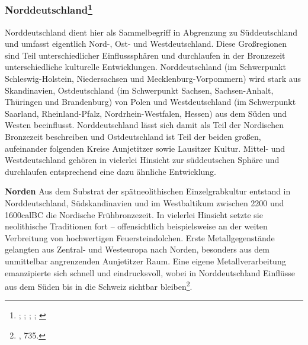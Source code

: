 \documentclass[openany,twoside,twocolumn]{book}
\let\rmarkdownfootnote\footnote%
\def\footnote{\protect\rmarkdownfootnote}
\begin{document}
\hypertarget{norddeutschland}{%
\subsubsection[Norddeutschland]{\texorpdfstring{Norddeutschland\footnote{\textcite{gorner_bestattungssitten_2002}; \textcite{hofmann_rituelle_2008}; \textcite{jockenhovel_germany_2013}; \textcite{jockenhovel_von_2003}; \textcite{schmidt_studien_1993}}}{Norddeutschland}}\label{norddeutschland}}

Norddeutschland dient hier als Sammelbegriff in Abgrenzung zu Süddeutschland und umfasst eigentlich Nord-, Ost- und Westdeutschland. Diese Großregionen sind Teil unterschiedlicher Einflusssphären und durchlaufen in der Bronzezeit unterschiedliche kulturelle Entwicklungen. Norddeutschland (im Schwerpunkt Schleswig-Holstein, Niedersachsen und Mecklenburg-Vorpommern) wird stark aus Skandinavien, Ostdeutschland (im Schwerpunkt Sachsen, Sachsen-Anhalt, Thüringen und Brandenburg) von Polen und Westdeutschland (im Schwerpunkt Saarland, Rheinland-Pfalz, Nordrhein-Westfalen, Hessen) aus dem Süden und Westen beeinflusst. Norddeutschland lässt sich damit als Teil der Nordischen Bronzezeit beschreiben und Ostdeutschland ist Teil der beiden großen, aufeinander folgenden Kreise Aunjetitzer sowie Lausitzer Kultur. Mittel- und Westdeutschland gehören in vielerlei Hinsicht zur süddeutschen Sphäre und durchlaufen entsprechend eine dazu ähnliche Entwicklung.

\textbf{Norden} \newline 
Aus dem Substrat der spätneolithischen Einzelgrabkultur entstand in Norddeutschland, Südskandinavien und im Westbaltikum zwischen 2200 und 1600calBC die Nordische Frühbronzezeit. In vielerlei Hinsicht setzte sie neolithische Traditionen fort -- offensichtlich beispielsweise an der weiten Verbreitung von hochwertigen Feuersteindolchen. Erste Metallgegenstände gelangten aus Zentral- und Westeuropa nach Norden, besonders aus dem unmittelbar angrenzenden Aunjetitzer Raum. Eine eigene Metallverarbeitung emanzipierte sich schnell und eindrucksvoll, wobei in Norddeutschland Einflüsse aus dem Süden bis in die Schweiz sichtbar bleiben\footnote{\textcite{jockenhovel_germany_2013}, 735.}.
\end{document}

